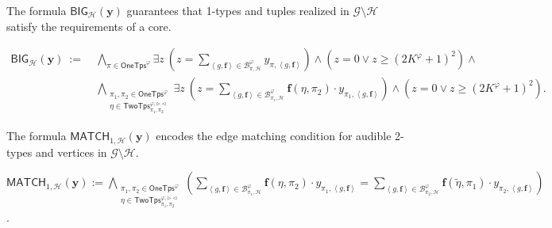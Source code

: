 \documentclass[10pt,a4paper]{article}
\theoremstyle{definition}
\theoremstyle{remark}
\newcommand{\cB}{\mathcal{B}}
\newcommand{\cG}{\mathcal{G}}
\newcommand{\cH}{\mathcal{H}}
\newcommand{\cK}{\mathsf{TwoTps}}
\newcommand{\bff}{\mathbf{f}}
\newcommand{\bfy}{\mathbf{y}}
\newcommand{\onetypes}{\mathsf{OneTps}}
\newcommand{\tuple}[1]       {\left\langle #1 \right\rangle}
\newcommand{\dual}[1] {\widetilde{ #1 }}
\newcommand{\trif} {\triangleright}
\newcommand{\trib} {\triangleleft}
\newcommand{\cKvpfb}    {\cK^{\varphi, \trif\trib}}
\newcommand{\bige}  {\mathsf{BIG}}
\newcommand{\match} {\mathsf{MATCH}}
\begin{document}
\begin{compactitem}
    \item
    The formula $\bige_{\cH}(\bfy)$ guarantees that 1-types and tuples realized in $\cG \setminus \cH$ satisfy the requirements of a core. \\
    \begin{notsotiny}
    $
    \begin{aligned}
            \bige_{\cH}(\bfy)
        \ :=\ &
        \bigwedge_{\pi \in \onetypes^\varphi}
            \exists z\ 
            \left(
                z = \sum_{\tuple{g, \bff} \in \cB^\varphi_{\pi, \cH}} y_{\pi, \tuple{g, \bff}}
            \right) \land
            \left(
                z = 0  \lor
                z \ge {(2K^\varphi+1)}^2 
            \right)
        \land \\
        &\bigwedge_{\substack{
            \pi_1, \pi_2 \in \onetypes^\varphi \\ 
            \eta \in \cKvpfb_{\pi_1, \pi_2}}}
        \exists z\ 
        \left(z = \sum_{\tuple{g, \bff} \in \cB^\varphi_{\pi_1, \cH}} \bff(\eta, \pi_2) \cdot y_{\pi_1, \tuple{g, \bff}}\right) \land
        \left(
            z = 0 \lor
            z \ge (2K^\varphi+1)^2
            \right).
        \end{aligned}
    $
    \end{notsotiny}
    \item
        The formula $\match_{1, \cH}(\bfy)$ encodes the edge matching condition for audible 2-types and vertices in $\cG \setminus \cH$. \\
        \begin{notsotiny}
        $\displaystyle
        \match_{1, \cH}(\bfy)
         := 
        \bigwedge_{\substack{
            \pi_1, \pi_2 \in \onetypes^\varphi \\
            \eta \in \cKvpfb_{\pi_1, \pi_2}}}
        \left(
            \sum_{\tuple{g, \bff} \in \cB^{\varphi}_{\pi_1, \cH}} \bff(\eta, \pi_2) \cdot y_{\pi_1, \tuple{g, \bff}}
            =
            \sum_{\tuple{g, \bff} \in \cB^{\varphi}_{\pi_2, \cH}} \bff(\dual{\eta}, \pi_1) \cdot y_{\pi_2, \tuple{g, \bff}}
        \right)
        $.
        \end{notsotiny}


\end{compactitem}
\end{document}
